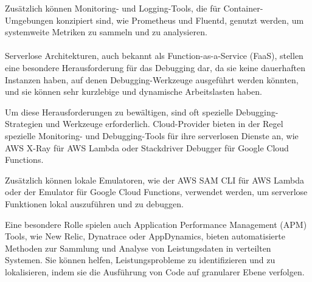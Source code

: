 Zusätzlich können Monitoring- und Logging-Tools, die für Container-Umgebungen konzipiert sind, wie Prometheus und Fluentd, genutzt werden, um systemweite Metriken zu sammeln und zu analysieren.
\\\\
Serverlose Architekturen, auch bekannt als Function-as-a-Service (FaaS), stellen eine besondere Herausforderung für das Debugging dar, da sie keine dauerhaften Instanzen haben, auf denen Debugging-Werkzeuge ausgeführt werden könnten, und sie können sehr kurzlebige und dynamische Arbeitslasten haben.

Um diese Herausforderungen zu bewältigen, sind oft spezielle Debugging-Strategien und Werkzeuge erforderlich. Cloud-Provider bieten in der Regel spezielle Monitoring- und Debugging-Tools für ihre serverlosen Dienste an, wie AWS X-Ray für AWS Lambda oder Stackdriver Debugger für Google Cloud Functions.

Zusätzlich können lokale Emulatoren, wie der AWS SAM CLI für AWS Lambda oder der Emulator für Google Cloud Functions, verwendet werden, um serverlose Funktionen lokal auszuführen und zu debuggen.

Eine besondere Rolle spielen auch Application Performance Management (APM) Tools, wie New Relic, Dynatrace oder AppDynamics, bieten automatisierte Methoden zur Sammlung und Analyse von Leistungsdaten in verteilten Systemen. Sie können helfen, Leistungsprobleme zu identifizieren und zu lokalisieren, indem sie die Ausführung von Code auf granularer Ebene verfolgen.

